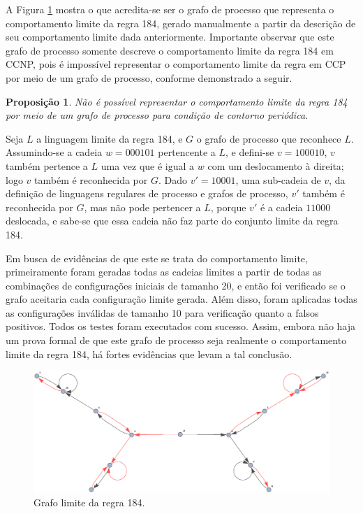 \documentclass[12pt,a4paper]{article}
\newtheorem{proposition}[theorem]{Proposição}
\newenvironment{proof}[1][Prova]{\begin{trivlist}
\item[\hskip \labelsep {\bfseries #1}]}{\end{trivlist}}
\begin{document}
A Figura \ref{fig:limit184w} mostra o que acredita-se ser o grafo de processo
que representa o comportamento limite da regra 184, gerado manualmente
a partir da descrição de seu comportamento limite dada anteriormente.
Importante observar que este grafo de processo somente descreve o comportamento
limite da regra 184 em CCNP, pois é impossível representar o comportamento limite
da regra em CCP por meio de um grafo de processo, conforme demonstrado a seguir.

\begin{proposition}
Não é possível representar o comportamento limite da regra 184 por meio de
um grafo de processo para condição de contorno periódica.
\end{proposition}

\begin{proof}
Seja $L$ a linguagem limite da regra 184, e $G$
o grafo de processo que reconhece $L$. Assumindo-se a
cadeia $w = 000101$ pertencente a $L$, e defini-se $v = 100010$,
$v$ também pertence a $L$ uma vez que é igual
a $w$ com um deslocamento à direita; logo $v$ também é reconhecida por $G$.
Dado $v' = 10001$, uma sub-cadeia de $v$, da definição de
linguagens regulares de processo e grafos de processo, $v'$ também é
reconhecida por $G$, mas não pode pertencer a $L$, porque $v'$ é
a cadeia $11000$ deslocada, e sabe-se que essa cadeia não
faz parte do conjunto limite da regra 184.
\end{proof}

Em busca de evidências
de que este se trata do comportamento limite, primeiramente foram geradas
todas as cadeias limites a partir de todas as combinações de configurações
iniciais de tamanho 20, e então foi verificado se o grafo aceitaria cada
configuração limite gerada. Além disso, foram aplicadas todas as configurações
inválidas de tamanho 10 para verificação quanto a falsos positivos. Todos os
testes foram executados com sucesso.
Assim, embora não haja um prova formal de que este grafo de processo seja
realmente o comportamento limite da regra 184, há fortes evidências que
levam a tal conclusão.

\begin{figure}[htp]
\begin{center}
\includegraphics[scale=0.60]{img/limit184w.eps}
\caption{Grafo limite da regra 184.}
\label{fig:limit184w}
\end{center}
\end{figure}
\end{document}
